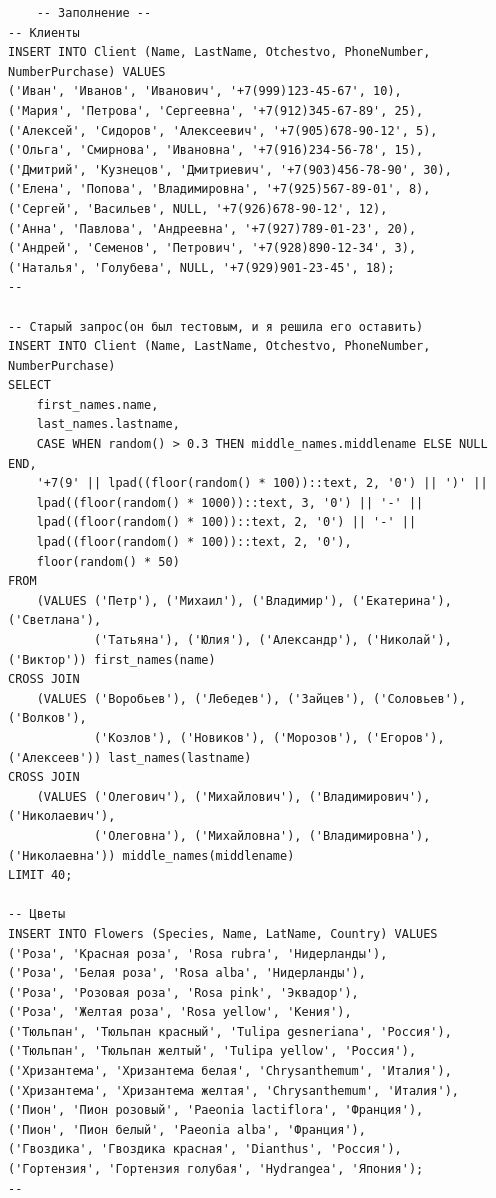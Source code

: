 \documentclass[bachelor, och, referat, times]{SCWorks}
\begin{document}
{\footnotesize
\begin{verbatim}
    -- Заполнение -- 
-- Клиенты
INSERT INTO Client (Name, LastName, Otchestvo, PhoneNumber, NumberPurchase) VALUES
('Иван', 'Иванов', 'Иванович', '+7(999)123-45-67', 10),
('Мария', 'Петрова', 'Сергеевна', '+7(912)345-67-89', 25),
('Алексей', 'Сидоров', 'Алексеевич', '+7(905)678-90-12', 5),
('Ольга', 'Смирнова', 'Ивановна', '+7(916)234-56-78', 15),
('Дмитрий', 'Кузнецов', 'Дмитриевич', '+7(903)456-78-90', 30),
('Елена', 'Попова', 'Владимировна', '+7(925)567-89-01', 8),
('Сергей', 'Васильев', NULL, '+7(926)678-90-12', 12),
('Анна', 'Павлова', 'Андреевна', '+7(927)789-01-23', 20),
('Андрей', 'Семенов', 'Петрович', '+7(928)890-12-34', 3),
('Наталья', 'Голубева', NULL, '+7(929)901-23-45', 18);
--

-- Старый запрос(он был тестовым, и я решила его оставить)
INSERT INTO Client (Name, LastName, Otchestvo, PhoneNumber, NumberPurchase)
SELECT 
    first_names.name,
    last_names.lastname,
    CASE WHEN random() > 0.3 THEN middle_names.middlename ELSE NULL END,
    '+7(9' || lpad((floor(random() * 100))::text, 2, '0') || ')' || 
    lpad((floor(random() * 1000))::text, 3, '0') || '-' ||
    lpad((floor(random() * 100))::text, 2, '0') || '-' ||
    lpad((floor(random() * 100))::text, 2, '0'),
    floor(random() * 50)
FROM 
    (VALUES ('Петр'), ('Михаил'), ('Владимир'), ('Екатерина'), ('Светлана'),
            ('Татьяна'), ('Юлия'), ('Александр'), ('Николай'), ('Виктор')) first_names(name)
CROSS JOIN 
    (VALUES ('Воробьев'), ('Лебедев'), ('Зайцев'), ('Соловьев'), ('Волков'),
            ('Козлов'), ('Новиков'), ('Морозов'), ('Егоров'), ('Алексеев')) last_names(lastname)
CROSS JOIN 
    (VALUES ('Олегович'), ('Михайлович'), ('Владимирович'), ('Николаевич'),
            ('Олеговна'), ('Михайловна'), ('Владимировна'), ('Николаевна')) middle_names(middlename)
LIMIT 40;

-- Цветы
INSERT INTO Flowers (Species, Name, LatName, Country) VALUES
('Роза', 'Красная роза', 'Rosa rubra', 'Нидерланды'),
('Роза', 'Белая роза', 'Rosa alba', 'Нидерланды'),
('Роза', 'Розовая роза', 'Rosa pink', 'Эквадор'),
('Роза', 'Желтая роза', 'Rosa yellow', 'Кения'),
('Тюльпан', 'Тюльпан красный', 'Tulipa gesneriana', 'Россия'),
('Тюльпан', 'Тюльпан желтый', 'Tulipa yellow', 'Россия'),
('Хризантема', 'Хризантема белая', 'Chrysanthemum', 'Италия'),
('Хризантема', 'Хризантема желтая', 'Chrysanthemum', 'Италия'),
('Пион', 'Пион розовый', 'Paeonia lactiflora', 'Франция'),
('Пион', 'Пион белый', 'Paeonia alba', 'Франция'),
('Гвоздика', 'Гвоздика красная', 'Dianthus', 'Россия'),
('Гортензия', 'Гортензия голубая', 'Hydrangea', 'Япония');
--


\end{verbatim}}
\end{document}
